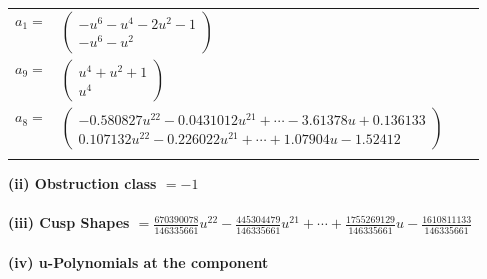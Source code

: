 \documentclass[1p]{elsarticle_modified}
\theoremstyle{definition}
\begin{document}
\begin{tabular}{m{7pt} m{180pt} m{7pt} m{180pt} }
\flushright $a_{1}=$&$\begin{pmatrix}- u^6- u^4-2 u^2-1\\- u^6- u^2\end{pmatrix}$ \\
\flushright $a_{9}=$&$\begin{pmatrix}u^4+u^2+1\\u^4\end{pmatrix}$ \\
\flushright $a_{8}=$&$\begin{pmatrix}-0.580827 u^{22}-0.0431012 u^{21}+\cdots-3.61378 u+0.136133\\0.107132 u^{22}-0.226022 u^{21}+\cdots+1.07904 u-1.52412\end{pmatrix}$\\&\end{tabular}
\flushleft \textbf{(ii) Obstruction class $= -1$}\\~\\
\flushleft \textbf{(iii) Cusp Shapes $= \frac{670390078}{146335661} u^{22}-\frac{445304479}{146335661} u^{21}+\cdots+\frac{1755269129}{146335661} u-\frac{1610811133}{146335661}$}\\~\\
\newpage\renewcommand{\arraystretch}{1}
\flushleft \textbf{(iv) u-Polynomials at the component}\newline \\
\end{document}
